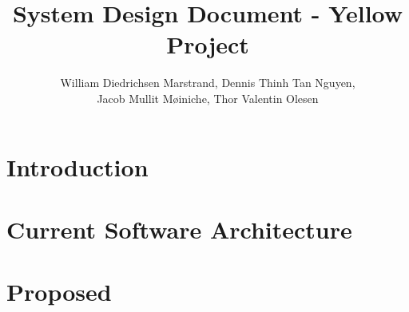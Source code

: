 \documentclass{article}
\title{System Design Document - Yellow Project}
\author{William Diedrichsen Marstrand, Dennis Thinh Tan Nguyen, 
\\Jacob Mullit Møiniche, Thor Valentin Olesen}
\begin{document}
\maketitle

\section{Introduction}
	
	

\section{Current Software Architecture}

\section{Proposed}
\end{document}
